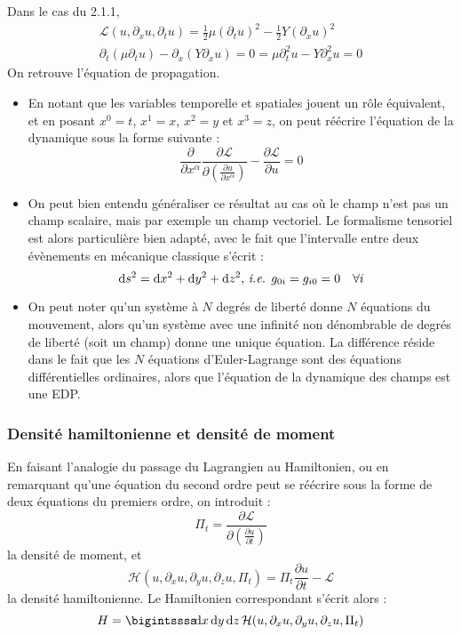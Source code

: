 Dans le cas du 2.1.1,
$$
	\begin{array}{c}
		\mathcal{L}(u,\partial_xu,\partial_tu)=\frac{1}{2}\mu(\partial_tu)^2-\frac{1}{2}Y(\partial_xu)^2\\
		\partial_t(\mu\partial_tu)-\partial_x(Y\partial_xu)=0=\mu\partial_t^2u-Y\partial_x^2u=0
	\end{array}
$$
On retrouve l'équation de propagation.

\begin{remarks}\hspace*{1em}
\begin{itemize}
	\item En notant que les variables temporelle et spatiales jouent un r\^ole équivalent, et en posant $x^0=t$, $x^1=x$, $x^2=y$ et $x^3=z$, on peut réécrire l'équation de la dynamique sous la forme suivante :
	$$
		\boxed{\frac{\partial}{\partial x^{\alpha}}\frac{\partial\mathcal{L}}{\partial\left(\frac{\partial u}{\partial x^{\alpha}}\right)}-\frac{\partial\mathcal{L}}{\partial u}=0}
	$$
	\item On peut bien entendu généraliser ce résultat au cas où le champ n'est pas un champ scalaire, mais par exemple un champ vectoriel. Le formalisme tensoriel est alors particulière bien adapté, avec le fait que l'intervalle entre deux évènements en mécanique classique s'écrit :
	$$
		\mathrm{d} s^2=\mathrm{d} x^2+\mathrm{d} y^2+\mathrm{d} z^2\text{, \emph{i.e.} }g_{0i}=g_{i0}=0\kern 1em \forall i
	$$
	\item On peut noter qu'un système à $N$ degrés de liberté donne $N$ équations du mouvement, alors qu'un système avec une infinité non dénombrable de degrés de liberté (soit un champ) donne une unique équation. La différence réside dans le fait que les $N$ équations d'Euler-Lagrange sont des équations différentielles ordinaires, alors que l'équation de la dynamique des champs est une EDP.
\end{itemize}
\end{remarks}

\subsubsection{Densité hamiltonienne et densité de moment}
En faisant l'analogie du passage du Lagrangien au Hamiltonien, ou en remarquant qu'une équation du second ordre peut se réécrire sous la forme de deux équations du premiers ordre, on introduit :
$$
	\Pi_t=\frac{\partial\mathcal{L}}{\partial\left(\frac{\partial u}{\partial t}\right)}
$$
la densité de moment, et 
$$
	\mathcal{H}(u,\partial_xu,\partial_yu,\partial_zu,\Pi_t)=\Pi_t\frac{\partial u}{\partial t}-\mathcal{L}
$$
la densité hamiltonienne.
Le Hamiltonien correspondant s'écrit alors :
$$
	H=\bigintssss\!\dif x\,\dif y\,\dif z\,\mathcal{H}(u,\partial_xu,\partial_yu,\partial_zu,\Pi_t)
$$

